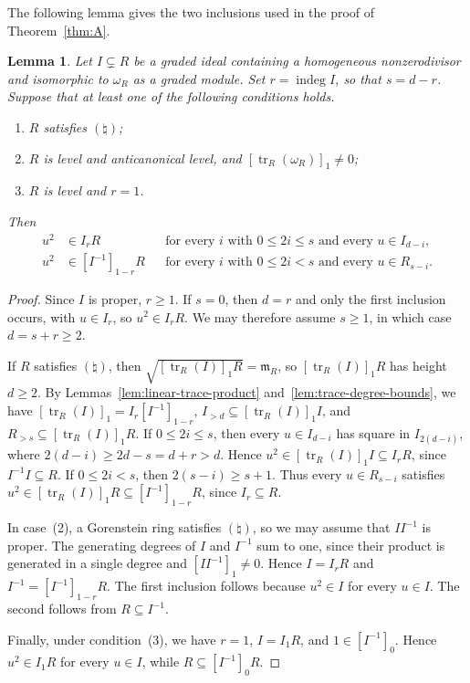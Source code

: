 \documentclass[a4paper,11pt]{amsart}
\DeclareMathOperator{\tr}{tr}
\DeclareMathOperator{\indeg}{indeg}
\newcommand{\m}{\mathfrak{m}}
\newcommand{\natur}{\natural}
\newtheorem{lemma}[theorem]{Lemma}
\theoremstyle{definition}
\begin{document}
The following lemma gives the two inclusions used in the proof of Theorem~\ref{thm:A}.

\begin{lemma}\label{lem:canonical-squares}
Let $I\subsetneq R$ be a graded ideal containing a homogeneous nonzerodivisor and isomorphic to $\omega_R$ as a graded module. Set $r=\indeg I$, so that $s=d-r$. Suppose that at least one of the following conditions holds.
\begin{enumerate}
\item $R$ satisfies $(\natur)$;
\item $R$ is level and anticanonical level, and $[\tr_R(\omega_R)]_1\ne0$;
\item $R$ is level and $r=1$.
\end{enumerate}
Then
\[
\begin{aligned}
 u^2&\in I_rR &&\text{for every }i\text{ with }0\leq 2i\leq s\text{ and every }u\in I_{d-i},\\
 u^2&\in [I^{-1}]_{1-r}R &&\text{for every }i\text{ with }0\leq 2i<s\text{ and every }u\in R_{s-i}.
\end{aligned}
\]
\end{lemma}
\begin{proof}
Since $I$ is proper, $r\ge1$. If $s=0$, then $d=r$ and only the first inclusion occurs, with $u\in I_r$, so $u^2\in I_rR$. We may therefore assume $s\ge1$, in which case $d=s+r\ge2$.

If $R$ satisfies $(\natur)$, then $\sqrt{[\tr_R(I)]_1R}=\m_R$, so $[\tr_R(I)]_1R$ has height $d\geq2$. By Lemmas~\ref{lem:linear-trace-product} and~\ref{lem:trace-degree-bounds}, we have $[\tr_R(I)]_1=I_r[I^{-1}]_{1-r}$, $I_{>d}\subseteq[\tr_R(I)]_1I$, and $R_{>s}\subseteq[\tr_R(I)]_1R$. If $0\leq2i\leq s$, then every $u\in I_{d-i}$ has square in $I_{2(d-i)}$, where $2(d-i)\geq 2d-s=d+r>d$. Hence $u^2\in[\tr_R(I)]_1I\subseteq I_rR$, since $I^{-1}I\subseteq R$. If $0\leq2i<s$, then $2(s-i)\geq s+1$. Thus every $u\in R_{s-i}$ satisfies $u^2\in[\tr_R(I)]_1R\subseteq[I^{-1}]_{1-r}R$, since $I_r\subseteq R$.

In case~\textup{(2)}, a Gorenstein ring satisfies $(\natur)$, so we may assume that $II^{-1}$ is proper. The generating degrees of $I$ and $I^{-1}$ sum to one, since their product is generated in a single degree and $[II^{-1}]_1\ne0$. Hence $I=I_rR$ and $I^{-1}=[I^{-1}]_{1-r}R$. The first inclusion follows because $u^2\in I$ for every $u\in I$. The second follows from $R\subseteq I^{-1}$.

Finally, under condition~\textup{(3)}, we have $r=1$, $I=I_1R$, and $1\in[I^{-1}]_0$. Hence $u^2\in I_1R$ for every $u\in I$, while $R\subseteq[I^{-1}]_0R$.
\end{proof}
\end{document}
